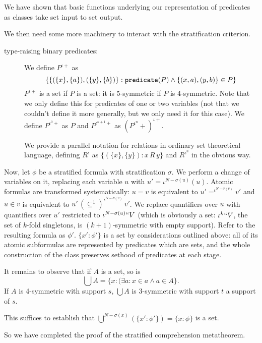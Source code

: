 \documentclass[12pt]{article}
\begin{document}
We have shown that basic functions underlying our representation of predicates as classes take set input to set output.

We then need some more machinery to interact with the stratification criterion.

\begin{description}

\item[type-raising binary predicates:]  We define $P^{\iota+}$ as $$\{  \{(\{x\},\{a\}),(\{y\},\{b\})\}:{\tt predicate}(P) \wedge \{(x,a),(y,b)\} \in P\}$$
$P^{\iota+}$ is a set if $P$ is a set:  it is 5-symmetric if $P$ is 4-symmetric.  Note that we only define this for predicates of one or two variables (not that we couldn't define it more generally, but we only need it for this case).  We define
$P^{\iota^0+}$ as $P$ and $P^{\iota^{n+1}+}$ as $(P^{\iota^n}+)^{\iota+}$.

We provide a parallel notation for relations in ordinary set theoretical language, defining $R^{\iota}$ as
$\{(\{x\},\{y\}):x\, R\, y\}$ and $R^{\iota^n}$ in the obvious way.

\end{description}

Now, let $\phi$ be a stratified formula with stratification $\sigma$.  We perform a change of variables on it,
replacing each variable $u$ with $u' = \iota^{N-\sigma(u)}(u)$.  Atomic formulas are transformed systematically:
$u=v$ is equivalent to $u' =^{\iota^{N-\sigma(v)}}v'$ and $u\in v$ is equivalent to $u' \, (\subseteq^1)^{\iota^{N-\sigma(v)}}\,v'$.  We replace quantifiers over $u$ with quantifiers over $u'$ restricted to $\iota^{N-\sigma(u)}``V$ (which is obviously a set: $\iota^k``V$, the set of $k$-fold singletons, is $(k+1)$-symmetric with empty support).
Refer to the resulting formula as $\phi'$.   $\{x':\phi'\}$ is a set by considerations outlined above:  all of its
atomic subformulas are represented by predicates which are sets, and the whole construction of the class preserves sethood of predicates at each stage.

It remains to observe that if $A$ is a set, so is $$\bigcup A = \{x:(\exists a:x \in a \wedge a \in A\}.$$  If $A$ is
4-symmetric with support $s$, $\bigcup A$ is 3-symmetric with support $t$ a support of $s$.

This suffices to establish that $\bigcup^{N-\sigma(x)}(\{x':\phi'\}) = \{x:\phi\}$ is a set.

So we have completed the proof of the stratified comprehension metatheorem.
\end{document}
